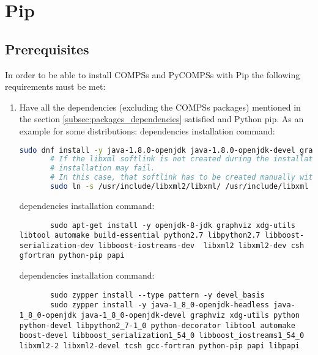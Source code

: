 \section{Pip}
\label{sec:Pip}

\subsection{Prerequisites}
\label{subsec:pip_prerequisites}
In order to be able to install COMPSs and PyCOMPSs with Pip the following requirements must be met:
\begin{enumerate}
 \item Have all the dependencies (excluding the COMPSs packages) mentioned in the section \ref{subsec:packages_dependencies} satisfied and Python pip.
 As an example for some distributions:
    dependencies installation command:
     \begin{lstlisting}[language=bash]
       sudo dnf install -y java-1.8.0-openjdk java-1.8.0-openjdk-devel graphviz xdg-utils libtool automake python python-libs python-pip python-devel python2-decorator boost-devel boost-serialization boost-iostreams libxml2 libxml2-devel gcc gcc-c++ gcc-gfortran tcsh @development-tools redhat-rpm-config papi
       # If the libxml softlink is not created during the installation of libxml2, the COMPSs 
       # installation may fail.
       # In this case, that softlink has to be created manually with the following command:
       sudo ln -s /usr/include/libxml2/libxml/ /usr/include/libxml
     \end{lstlisting}
    dependencies installation command:
     \begin{lstlisting}
       sudo apt-get install -y openjdk-8-jdk graphviz xdg-utils libtool automake build-essential python2.7 libpython2.7 libboost-serialization-dev libboost-iostreams-dev  libxml2 libxml2-dev csh gfortran python-pip papi
     \end{lstlisting}   
    dependencies installation command:
     \begin{lstlisting}
       sudo zypper install --type pattern -y devel_basis
       sudo zypper install -y java-1_8_0-openjdk-headless java-1_8_0-openjdk java-1_8_0-openjdk-devel graphviz xdg-utils python python-devel libpython2_7-1_0 python-decorator libtool automake  boost-devel libboost_serialization1_54_0 libboost_iostreams1_54_0  libxml2-2 libxml2-devel tcsh gcc-fortran python-pip papi libpapi
     \end{lstlisting}

\end{enumerate}
